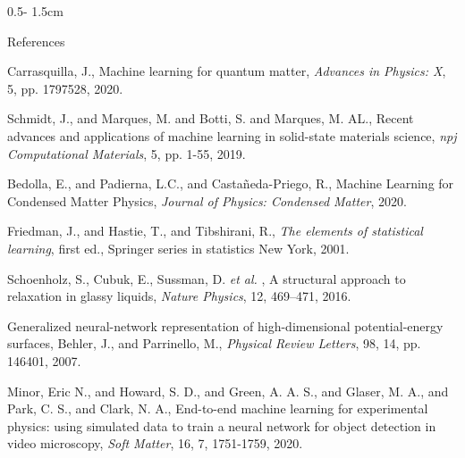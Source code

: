\documentclass{uioposter}
\newcommand{\etal}{\emph{et al. }}
\begin{document}
\begin{frame}
\begin{columns}[onlytextwidth]
\begin{column}{0.5\textwidth - 1.5cm}
    \begin{alertblock}{References}
        \begin{thebibliography}{99}
            Carrasquilla, J.,
            Machine learning for quantum matter,
            \emph{Advances in Physics: X},
            5, pp. 1797528, 2020.
            
            Schmidt, J., and Marques, M. and Botti, S. and Marques, M. AL.,
            Recent advances and applications of machine learning in solid-state materials science,
            \emph{npj Computational Materials},
            5, pp. 1-55, 2019.
            
            Bedolla, E., and Padierna, L.C., and Casta{\~n}eda-Priego, R.,
            Machine Learning for Condensed Matter Physics,
            \emph{Journal of Physics: Condensed Matter},
            2020.

            Friedman, J., and Hastie, T., and Tibshirani, R.,
            \emph{The elements of statistical learning},
            first ed., Springer series in statistics New York, 2001.

            Schoenholz, S., Cubuk, E., Sussman, D. \etal,
            A structural approach to relaxation in glassy liquids,
            \emph{Nature Physics},
            12, 469–471, 2016.

            Generalized neural-network representation of high-dimensional
            potential-energy surfaces,
            Behler, J., and Parrinello, M.,
            \emph{Physical Review Letters},
            98, 14, pp. 146401, 2007.

            Minor, Eric N., and Howard, S. D., and Green, A. A. S., and Glaser, M. A., and Park, C. S., and Clark, N. A.,
            End-to-end machine learning for experimental physics: using simulated data to train a neural network for object detection in video microscopy,
            \emph{Soft Matter},
            16, 7, 1751-1759, 2020.
            \end{thebibliography}
    \end{alertblock}

\end{column}



\end{columns}
\end{frame}
\end{document}
